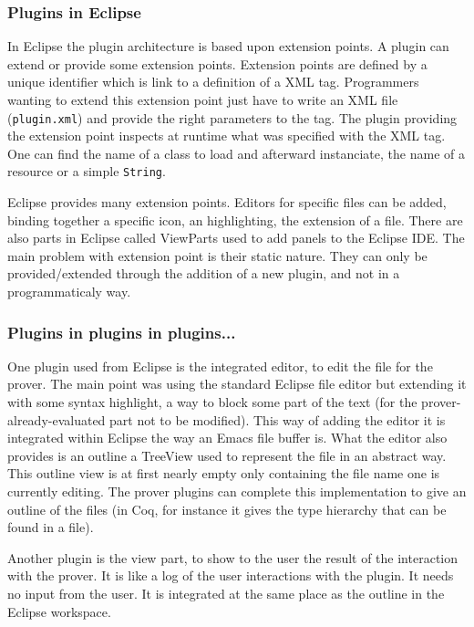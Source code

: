 \documentclass{entcs}
\begin{document}
\subsubsection{Plugins in Eclipse}
\label{subsubsec:plugins-eclipse}

In Eclipse the plugin architecture is based upon extension points.
A plugin can extend or provide some extension points. 
Extension points are defined by a unique identifier which is link
to a definition of a XML tag. Programmers wanting to extend
this extension point just have to write an XML file ({\tt plugin.xml}) 
and provide the right parameters to the tag.
The plugin providing the extension point inspects at runtime what was 
specified with the XML tag. One can find the name of a class to load
and afterward instanciate, the name of a resource or a simple {\tt String}.

Eclipse provides many extension points. Editors for specific files can be
added, binding together a specific icon, an highlighting, the extension of a
file. There are also parts in Eclipse called ViewParts used to add panels to 
the Eclipse IDE.
The main problem with extension point is their static nature.
They can only be provided/extended through the addition of a
new plugin, and not in a programmaticaly way.
\subsubsection{Plugins in plugins in plugins...}
\label{subsubsec:plug-plug-plug}
One plugin used from Eclipse is the integrated editor, to edit the 
file for the prover. The main point was using the standard Eclipse file editor
but extending it with some syntax highlight, a way to block some part
of the text (for the prover-already-evaluated part not to be modified). This
way of adding the editor it is integrated within Eclipse the way an Emacs 
file buffer is.  What the editor also provides is an outline a TreeView
used to represent the file in an abstract way. This outline view
is at first nearly empty only containing the file name one is currently
editing. The prover plugins can complete this implementation to give
an outline of the files (in Coq, for instance it gives the type
hierarchy that can be found in a file).

Another plugin is the view part, to show to the user the result of the
interaction with the prover. It is like a log of the user interactions
with the plugin. It needs no input from the user. It is integrated
at the same place as the outline in the Eclipse workspace.
\end{document}
